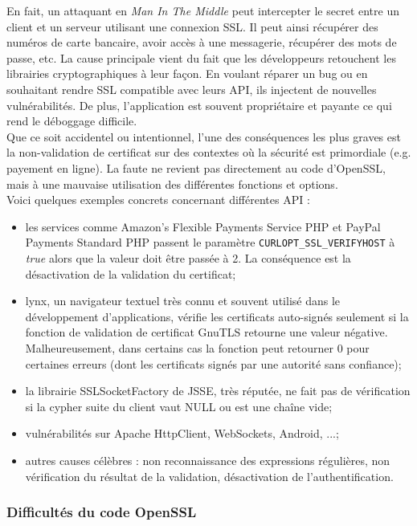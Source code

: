 En fait, un attaquant en \textit{Man In The Middle} peut intercepter le secret entre un client et un serveur utilisant une connexion SSL. Il peut ainsi récupérer des numéros de carte bancaire, avoir accès à une messagerie, récupérer des mots de passe, etc. La cause principale vient du fait que les développeurs retouchent les librairies cryptographiques à leur façon. En voulant réparer un bug ou en souhaitant rendre SSL compatible avec leurs API, ils injectent de nouvelles vulnérabilités. De plus, l'application est souvent propriétaire et payante ce qui rend le déboggage difficile.\\


Que ce soit accidentel ou intentionnel, l'une des conséquences les plus graves est la non-validation de certificat sur des contextes où la sécurité est primordiale (e.g. payement en ligne). La faute ne revient pas directement au code d'OpenSSL, mais à une mauvaise utilisation des différentes fonctions et options.\\


Voici quelques exemples concrets concernant différentes API :
\begin{itemize}
\item les services comme Amazon's Flexible Payments Service PHP et PayPal Payments Standard PHP passent le paramètre \texttt{CURLOPT\_SSL\_VERIFYHOST} à \textit{true} alors que la valeur doit être passée à 2. La conséquence est la désactivation de la validation du certificat;
\item lynx, un navigateur textuel très connu et souvent utilisé dans le développement d'applications, vérifie les certificats auto-signés seulement si la fonction de validation de certificat GnuTLS retourne une valeur négative. Malheureusement, dans certains cas la fonction peut retourner 0 pour certaines erreurs (dont les certificats signés par une autorité sans confiance);
\item la librairie SSLSocketFactory de JSSE, très réputée, ne fait pas de vérification si la cypher suite du client vaut NULL ou est une chaîne vide;
\item vulnérabilités sur Apache HttpClient, WebSockets, Android, ...;
\item autres causes célèbres : non reconnaissance des expressions régulières, non vérification du résultat de la validation, désactivation de l'authentification.\\
\end{itemize}


\subsubsection{Difficultés du code OpenSSL}


